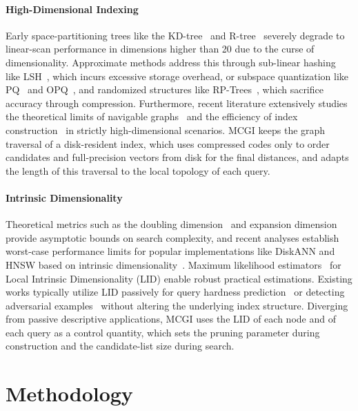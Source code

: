 \documentclass{article}
\theoremstyle{plain}
\theoremstyle{definition}
\theoremstyle{remark}
\begin{document}
\paragraph{High-Dimensional Indexing}
Early space-partitioning trees like the KD-tree~\cite{bentley1975multidimensional} and R-tree~\cite{guttman1984r} severely degrade to linear-scan performance in dimensions higher than 20 due to the curse of dimensionality. Approximate methods address this through sub-linear hashing like LSH~\cite{indyk1998approximate, datar2004locality}, which incurs excessive storage overhead, or subspace quantization like PQ~\cite{jegou2011product} and OPQ~\cite{ge2013optimized}, and randomized structures like RP-Trees~\cite{dasgupta2008random}, which sacrifice accuracy through compression. Furthermore, recent literature extensively studies the theoretical limits of navigable graphs~\cite{NEURIPS2024_6dc63b40} and the efficiency of index construction~\cite{10.14778/3594512.3594527} in strictly high-dimensional scenarios. MCGI keeps the graph traversal of a disk-resident index, which uses compressed codes only to order candidates and full-precision vectors from disk for the final distances, and adapts the length of this traversal to the local topology of each query.

\paragraph{Intrinsic Dimensionality}
Theoretical metrics such as the doubling dimension~\cite{gupta2003bounded} and expansion dimension~\cite{karger2002finding} provide asymptotic bounds on search complexity, and recent analyses establish worst-case performance limits for popular implementations like DiskANN and HNSW based on intrinsic dimensionality~\cite{NEURIPS2023_d0ac28b7}. Maximum likelihood estimators~\cite{NIPS2004_74934548} for Local Intrinsic Dimensionality (LID) enable robust practical estimations. Existing works typically utilize LID passively for query hardness prediction~\cite{he2012difficulty, 10.14778/3704965.3704974} or detecting adversarial examples~\cite{ma2018characterizing} without altering the underlying index structure. Diverging from passive descriptive applications, MCGI uses the LID of each node and of each query as a control quantity, which sets the pruning parameter during construction and the candidate-list size during search.

\section{Methodology} 
\label{method}
\end{document}
